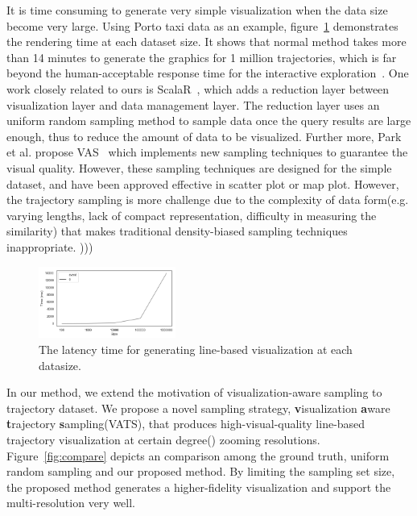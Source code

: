 It is time consuming to generate very simple visualization when the data size become very large. Using Porto taxi data \cite{} as an example, figure~\ref{fig:rendering_time} demonstrates the rendering time at each dataset size. It shows that normal method takes more than 14 minutes to generate the graphics for 1 million trajectories, which is far beyond the human-acceptable response time for the interactive exploration~\cite{shneiderman1984response}.
One work closely related to ours is ScalaR~\cite{battle2013dynamic}, which adds a reduction layer between visualization layer and data management layer. The reduction layer uses an uniform random sampling method to sample data once the query results are large enough, thus to reduce the amount of data to be visualized.
Further more, Park et al. propose VAS~\cite{park2016visualization} which implements new sampling techniques to guarantee the visual quality. However, these sampling techniques are designed for the simple dataset, and have been approved effective in scatter plot or map plot. However, the trajectory sampling is more challenge due to the complexity of data form(e.g. varying lengths, lack of compact representation, difficulty in measuring the similarity) that makes traditional density-biased sampling techniques inappropriate.  )))


\begin{figure}[t]
	\centering
	\includegraphics[width=0.4\textwidth]{pictures/introduction/timesize.png}
	\vspace{-5mm}
	\caption{The latency time for generating line-based visualization at each datasize.}
	\vspace{-5mm}
	\label{fig:rendering_time}
\end{figure}


In our method, we extend the motivation of visualization-aware sampling to trajectory dataset. We propose a novel sampling strategy, \textbf{v}isualization \textbf{a}ware \textbf{t}rajectory \textbf{s}ampling(VATS), that produces high-visual-quality line-based trajectory visualization at certain degree() zooming resolutions. 
Figure~\ref{fig:compare} depicts an comparison among the ground truth,  uniform random sampling and our proposed method. By limiting the sampling set size, the proposed method generates a higher-fidelity visualization and support the multi-resolution very well.   


